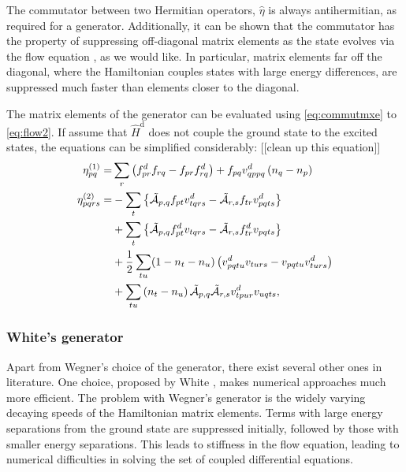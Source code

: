 \documentclass[amsmath, amssymb, aps, floatfix, nofootinbib, preprintnumbers,showpacs, superscriptaddress, twocolumn]{revtex4-1}
\begin{document}
The commutator between two Hermitian operators, $\hat{\eta}$ is always antihermitian, as required for a generator.  Additionally, it can be shown that the commutator has the property of suppressing off-diagonal matrix elements as the state evolves via the flow equation \cite{kehrein2006flow}, as we would like.  In particular, matrix elements far off the diagonal, where the Hamiltonian couples states with large energy differences, are suppressed much faster than elements closer to the diagonal.

The matrix elements of the generator can be evaluated using \eqref{eq:commutmxe} to \eqref{eq:flow2}.  If assume that $\hat{H}^{\text{d}}$ does not couple the ground state to the excited states, the equations can be simplified considerably: [[clean up this equation]]
\begin{align*}
\eta_{pq}^{(1)} = & \sum_{r} \left(f_{pr}^d f_{rq} - f_{pr} f_{rq}^d \right) + f_{pq} v_{qppq}^d \left( n_q - n_p \right) \\ \eta_{pqrs}^{(2)} = & - \sum_t \left\lbrace \tilde{\mathcal{A}}_{p, q} f_{pt} v_{tqrs}^d - \tilde{\mathcal{A}}_{r, s} f_{tr} v_{pqts}^d \right\rbrace \notag \\ & + \sum_t \left\lbrace \tilde{\mathcal{A}}_{p, q} f_{pt}^d v_{tqrs} - \tilde{\mathcal{A}}_{r, s} f_{tr}^d v_{pqts} \right\rbrace \notag \\ & + \frac{1}{2} \sum_{tu} (1 - n_t - n_u) \left( v_{pqtu}^d v_{turs} - v_{pqtu} v_{turs}^d \right) \notag \\ & + \sum_{tu} \left( n_t - n_u \right) \tilde{\mathcal{A}}_{p, q} \tilde{\mathcal{A}}_{r, s} v_{tpur}^d v_{uqts},
\end{align*}

\subsubsection{White's generator}

Apart from Wegner's choice of the generator, there exist several other ones in literature. One choice, proposed by White \cite{White:cond-mat0201346}, makes numerical approaches much more efficient.  The problem with Wegner's generator is the widely varying decaying speeds of the Hamiltonian matrix elements.  Terms with large energy separations from the ground state are suppressed initially, followed by those with smaller energy separations.  This leads to stiffness in the flow equation, leading to numerical difficulties in solving the set of coupled differential equations.
\end{document}

